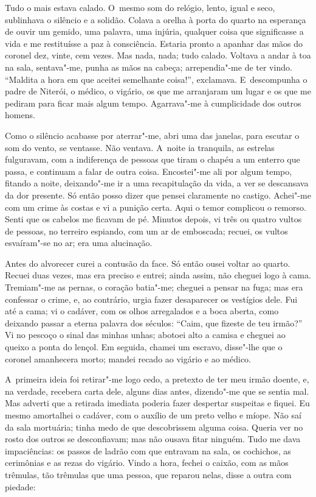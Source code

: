 Tudo o mais estava calado. O~mesmo som do relógio, lento, igual e seco,
sublinhava o silêncio e a solidão. Colava a orelha à porta do quarto na
esperança de ouvir um gemido, uma palavra, uma injúria, qualquer coisa
que significasse a vida e me restituísse a paz à consciência. Estaria
pronto a apanhar das mãos do coronel dez, vinte, cem vezes. Mas nada,
nada; tudo calado. Voltava a andar à toa na sala, sentava"-me, punha as
mãos na cabeça; arrependia"-me de ter vindo. ``Maldita a hora em que
aceitei semelhante coisa!'', exclamava. E~descompunha o padre de
Niterói, o médico, o vigário, os que me arranjaram um lugar e os que me
pediram para ficar mais algum tempo. Agarrava"-me à cumplicidade dos
outros homens.

Como o silêncio acabasse por aterrar"-me, abri uma das janelas, para
escutar o som do vento, se ventasse. Não ventava. A~noite ia tranquila,
as estrelas fulguravam, com a indiferença de pessoas que tiram o chapéu
a um enterro que passa, e continuam a falar de outra coisa. Encostei"-me
ali por algum tempo, fitando a noite, deixando"-me ir a uma recapitulação
da vida, a ver se descansava da dor presente. Só então posso dizer que
pensei claramente no castigo. Achei"-me com um crime às costas e vi a
punição certa. Aqui o temor complicou o remorso. Senti que os cabelos me
ficavam de pé. Minutos depois, vi três ou quatro vultos de pessoas, no
terreiro espiando, com um ar de emboscada; recuei, os vultos esvaíram"-se
no ar; era uma alucinação.

Antes do alvorecer curei a contusão da face. Só então ousei voltar ao
quarto. Recuei duas vezes, mas era preciso e entrei; ainda assim, não
cheguei logo à cama. Tremiam"-me as pernas, o coração batia"-me; cheguei a
pensar na fuga; mas era confessar o crime, e, ao contrário, urgia fazer
desaparecer os vestígios dele. Fui até a cama; vi o cadáver, com os
olhos arregalados e a boca aberta, como deixando passar a eterna palavra
dos séculos: ``Caim, que fizeste de teu irmão?'' Vi no pescoço o sinal
das minhas unhas; abotoei alto a camisa e cheguei ao queixo a ponta do
lençol. Em seguida, chamei um escravo, disse"-lhe que o coronel
amanhecera morto; mandei recado ao vigário e ao médico.

A~primeira ideia foi retirar"-me logo cedo, a pretexto de ter meu irmão
doente, e, na verdade, recebera carta dele, alguns dias antes,
dizendo"-me que se sentia mal. Mas adverti que a retirada imediata
poderia fazer despertar suspeitas e fiquei. Eu mesmo amortalhei o
cadáver, com o auxílio de um preto velho e míope. Não saí da sala
mortuária; tinha medo de que descobrissem alguma coisa. Queria ver no
rosto dos outros se desconfiavam; mas não ousava fitar ninguém. Tudo me
dava impaciências: os passos de ladrão com que entravam na sala, os
cochichos, as cerimônias e as rezas do vigário. Vindo a hora, fechei o
caixão, com as mãos trêmulas, tão trêmulas que uma pessoa, que reparou
nelas, disse a outra com piedade:


